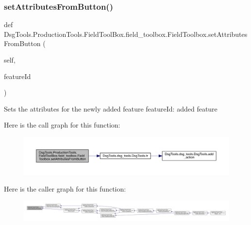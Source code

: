 \subsubsection{\texorpdfstring{set\+Attributes\+From\+Button()}{setAttributesFromButton()}}
{\footnotesize\ttfamily def Dsg\+Tools.\+Production\+Tools.\+Field\+Tool\+Box.\+field\+\_\+toolbox.\+Field\+Toolbox.\+set\+Attributes\+From\+Button (\begin{DoxyParamCaption}\item[{}]{self,  }\item[{}]{feature\+Id }\end{DoxyParamCaption})}

\begin{DoxyVerb}Sets the attributes for the newly added feature
featureId: added feature
\end{DoxyVerb}
 Here is the call graph for this function\+:
\nopagebreak
\begin{figure}[H]
\begin{center}
\leavevmode
\includegraphics[width=350pt]{class_dsg_tools_1_1_production_tools_1_1_field_tool_box_1_1field__toolbox_1_1_field_toolbox_a9a87b00d3a76bc0c7bce6f0c27b508df_cgraph}
\end{center}
\end{figure}
Here is the caller graph for this function\+:
\nopagebreak
\begin{figure}[H]
\begin{center}
\leavevmode
\includegraphics[width=350pt]{class_dsg_tools_1_1_production_tools_1_1_field_tool_box_1_1field__toolbox_1_1_field_toolbox_a9a87b00d3a76bc0c7bce6f0c27b508df_icgraph}
\end{center}
\end{figure}
\mbox{\label{class_dsg_tools_1_1_production_tools_1_1_field_tool_box_1_1field__toolbox_1_1_field_toolbox_a84e0b371a8fd1346e789c0a25bda6716}} 
